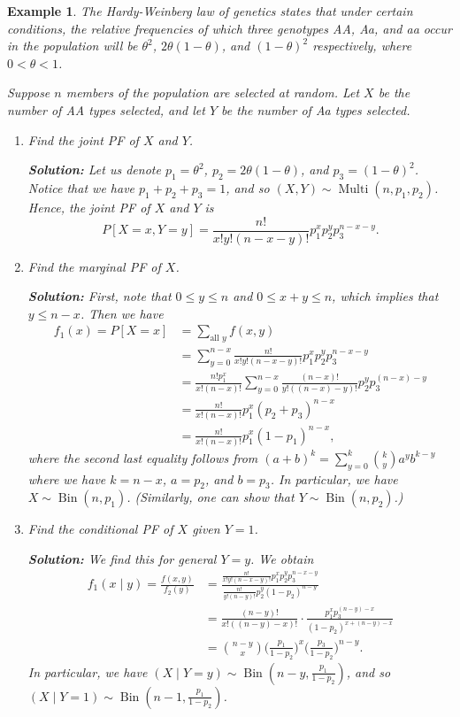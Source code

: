 \documentclass[10pt]{article}
\DeclareMathOperator{\Bin}{Bin}
\DeclareMathOperator{\Multi}{Multi}
\theoremstyle{newstyle}
\newtheorem{exmp}[thm]{Example}
\begin{document}
\begin{exmp}
The Hardy-Weinberg law of genetics states that under certain conditions, the relative frequencies 
of which three genotypes AA, Aa, and aa occur in the population will be $\theta^2$, 
$2\theta(1-\theta)$, and $(1-\theta)^2$ respectively, where $0 < \theta < 1$. 

Suppose $n$ members of the population are selected at random. Let $X$ be the number of AA 
types selected, and let $Y$ be the number of Aa types selected. 
\begin{enumerate}[(1)]
    \item Find the joint PF of $X$ and $Y$.
    
    {\color{blue}
    {\bf Solution:} Let us denote $p_1 = \theta^2$, $p_2 = 2\theta(1-\theta)$, and $p_3 = 
    (1-\theta)^2$. Notice that we have $p_1 + p_2 + p_3 = 1$, and so
    $(X, Y) \sim \Multi(n, p_1, p_2)$. Hence, the joint PF of $X$ and $Y$ is 
    \[ P[X=x, Y=y] = \frac{n!}{x!y!(n-x-y)!} p_1^x p_2^y p_3^{n-x-y}. \]}
    
    \item Find the marginal PF of $X$. 
    
    {\color{blue}
    {\bf Solution:} First, note that $0 \leq y \leq n$ and $0 \leq x+y \leq n$, which 
    implies that $y \leq n-x$. Then we have 
    \begin{align*}
        f_1(x) = P[X = x] &= \sum_{\text{all } y} f(x, y) \\
        &= \sum_{y=0}^{n-x} \frac{n!}{x!y!(n-x-y)!} p_1^x p_2^y p_3^{n-x-y} \\
        &= \frac{n!p_1^x}{x!(n-x)!} \sum_{y=0}^{n-x} \frac{(n-x)!}{y!((n-x)-y)!} p_2^y p_3^{(n-x)-y} \\
        &= \frac{n!}{x!(n-x)!} p_1^x (p_2 + p_3)^{n-x} \\
        &= \frac{n!}{x!(n-x)!} p_1^x (1-p_1)^{n-x},
    \end{align*} 
    where the second last equality follows from $(a+b)^k = \sum_{y=0}^k \binom{k}y a^y b^{k-y}$ 
    where we have $k = n-x$, $a = p_2$, and $b = p_3$. In particular, 
    we have $X \sim \Bin(n, p_1)$. (Similarly, one can show that $Y \sim \Bin(n, p_2)$.)}
    
    \item Find the conditional PF of $X$ given $Y=1$. 
    
    {\color{blue}
    {\bf Solution:} We find this for general $Y=y$. We obtain 
    \begin{align*} 
    f_1(x \mid y) = \frac{f(x,y)}{f_2(y)} &= \frac{\frac{n!}{x!y!(n-x-y)!} p_1^x p_2^y p_3^{n-x-y}}
    {\frac{n!}{y!(n-y)!} p_2^y (1-p_2)^{n-y}} \\
    &= \frac{(n-y)!}{x!((n-y)-x)!} \cdot \frac{p_1^x p_3^{(n-y)-x}}{(1-p_2)^{x+(n-y)-x}} \\
    &= \binom{n-y}x \bigg( \frac{p_1}{1-p_2} \bigg)^x \bigg( \frac{p_3}{1-p_2} \bigg)^{n-y}. 
    \end{align*}
    In particular, we have $(X \mid Y=y) \sim \Bin(n-y, \frac{p_1}{1-p_2})$, and so 
    $(X \mid Y=1) \sim \Bin(n-1, \frac{p_1}{1-p_2})$.
    }
    
\end{enumerate}
\end{exmp}
\end{document}
